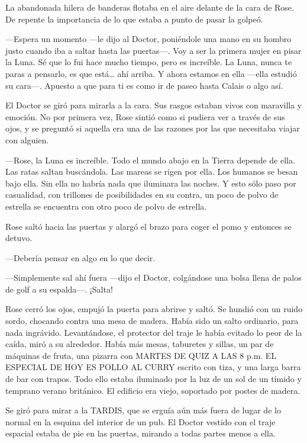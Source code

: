 La abandonada hilera de banderas flotaba en el aire delante de la cara
de Rose. De repente la importancia de lo que estaba a punto de pasar la
golpeó.

---Espera un momento ---le dijo al Doctor, poniéndole una mano en su
hombro justo cuando iba a saltar hasta las puertas---. Voy a ser la
primera mujer en pisar la Luna. Sé que lo fui hace mucho tiempo, pero es
increíble. La Luna, nunca te paras a pensarlo, es que está\ldots{} ahí
arriba. Y ahora estamos en ella ---ella estudió su cara---. Apuesto a que
para ti es como ir de paseo hasta Calais o algo así.

El Doctor se giró para mirarla a la cara. Sus rasgos estaban vivos con
maravilla y emoción. No por primera vez, Rose sintió como si pudiera ver
a través de sus ojos, y se preguntó si aquella era una de las razones
por las que necesitaba viajar con alguien.

---Rose, la Luna es increíble. Todo el mundo abajo en la Tierra depende
de ella. Las ratas saltan buscándola. Las mareas se rigen por ella. Los
humanos se besan bajo ella. Sin ella no habría nada que iluminara las
noches. Y esto sólo paso por casualidad, con trillones de posibilidades
en su contra, un poco de polvo de estrella se encuentra con otro poco de
polvo de estrella.

Rose saltó hacia las puertas y alargó el brazo para coger el pomo y
entonces se detuvo.

---Debería pensar en algo en lo que decir.

---Simplemente sal ahí fuera ---dijo el Doctor, colgándose una bolsa llena
de palos de golf a su espalda---. ¡Salta!

Rose cerró los ojos, empujó la puerta para abrirse y saltó. Se hundió
con un ruido sordo, chocando contra una mesa de madera. Había sido un
salto ordinario, para nada ingrávido. Levantándose, el protector del
traje le había evitado lo peor de la caída, miró a su alrededor. Había
más mesas, taburetes y sillas, un par de máquinas de fruta, una pizarra
con MARTES DE QUIZ A LAS 8 p.m. EL ESPECIAL DE HOY ES POLLO AL CURRY
escrito con tiza, y una larga barra de bar con trapos. Todo ello estaba
iluminado por la luz de un sol de un tímido y temprano verano británico.
El edificio era viejo, soportado por postes de madera.

Se giró para mirar a la TARDIS, que se erguía aún más fuera de lugar de
lo normal en la esquina del interior de un pub. El Doctor vestido con el
traje espacial estaba de pie en las puertas, mirando a todas partes
menos a ella.

